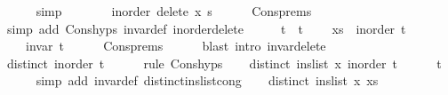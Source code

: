 \begin{isabellebody}
\ \ \ \ \isamarkupfalse%
\ simp\isanewline
\ \ \isamarkupfalse%
\ \isamarkupfalse%
\ {\isachardoublequoteopen}{\isachardot}{\kern0pt}{\isachardot}{\kern0pt}{\isachardot}{\kern0pt}\ {\isacharequal}{\kern0pt}\ inorder\ {\isacharparenleft}{\kern0pt}delete\ x\ s{\isacharparenright}{\kern0pt}{\isachardoublequoteclose}\isanewline
\ \ \ \ \isamarkupfalse%
\ Cons{\isachardot}{\kern0pt}prems\isanewline
\ \ \ \ \isamarkupfalse%
\ {\isacharparenleft}{\kern0pt}simp\ add{\isacharcolon}{\kern0pt}\ Cons{\isachardot}{\kern0pt}hyps{\isacharparenleft}{\kern0pt}{}{\isacharparenright}{\kern0pt}\ invar{\isacharunderscore}{\kern0pt}def\ inorder{\isacharunderscore}{\kern0pt}delete{\isacharparenright}{\kern0pt}\isanewline
\ \ \isamarkupfalse%
\ \isamarkupfalse%
\ t\ \ t{\isacharcolon}{\kern0pt}\isanewline
\ \ \ \ {\isachardoublequoteopen}xs\ {\isacharequal}{\kern0pt}\ inorder\ t{\isachardoublequoteclose}\isanewline
\ \ \ \ {\isachardoublequoteopen}invar\ t{\isachardoublequoteclose}\isanewline
\ \ \ \ \isamarkupfalse%
\ Cons{\isachardot}{\kern0pt}prems\isanewline
\ \ \ \ \isamarkupfalse%
\ {\isacharparenleft}{\kern0pt}blast\ intro{\isacharcolon}{\kern0pt}\ invar{\isacharunderscore}{\kern0pt}delete{\isacharparenright}{\kern0pt}\isanewline
\ \ \isamarkupfalse%
\ {\isachardoublequoteopen}distinct\ {\isacharparenleft}{\kern0pt}inorder\ t{\isacharparenright}{\kern0pt}{\isachardoublequoteclose}\isanewline
\ \ \ \ \isamarkupfalse%
\ {\isacharparenleft}{\kern0pt}rule\ Cons{\isachardot}{\kern0pt}hyps{\isacharparenleft}{\kern0pt}{}{\isacharparenright}{\kern0pt}{\isacharparenright}{\kern0pt}\isanewline
\ \ \isamarkupfalse%
\ {\isachardoublequoteopen}distinct\ {\isacharparenleft}{\kern0pt}ins{\isacharunderscore}{\kern0pt}list\ x\ {\isacharparenleft}{\kern0pt}inorder\ t{\isacharparenright}{\kern0pt}{\isacharparenright}{\kern0pt}{\isachardoublequoteclose}\isanewline
\ \ \ \ \isamarkupfalse%
\ t{\isacharparenleft}{\kern0pt}{}{\isacharparenright}{\kern0pt}\isanewline
\ \ \ \ \isamarkupfalse%
\ {\isacharparenleft}{\kern0pt}simp\ add{\isacharcolon}{\kern0pt}\ invar{\isacharunderscore}{\kern0pt}def\ distinct{\isacharunderscore}{\kern0pt}ins{\isacharunderscore}{\kern0pt}list{\isacharunderscore}{\kern0pt}cong{\isacharparenright}{\kern0pt}\isanewline
\ \ \isamarkupfalse%
\ {\isachardoublequoteopen}distinct\ {\isacharparenleft}{\kern0pt}ins{\isacharunderscore}{\kern0pt}list\ x\ xs{\isacharparenright}{\kern0pt}{\isachardoublequoteclose}\isanewline

\end{isabellebody}
